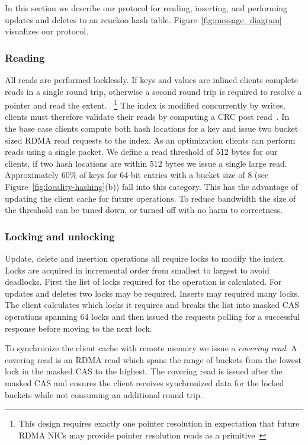 In this section we describe our protocol for reading,
inserting, and performing updates and deletes to an rcuckoo
hash table. Figure~\ref{fig:message_diagram} visualizes our
protocol.

\subsubsection{Reading} All reads are performed locklessly.
If keys and values are inlined clients complete reads in a
single round trip, otherwise a second round trip is required
to resolve a pointer and read the extent. 
~\footnote{This design requires exactly one pointer
resolution in expectation that future RDMA NICs may provide
pointer resolution reads as a primitive~\cite{prism}}
The index is modified concurrently by writes, clients must
therefore validate their reads by computing a CRC post
read~\cite{pilaf,cell}.
In the base case clients compute both hash locations for a
key and issue two bucket sized RDMA read requests to the
index. As an optimization clients can perform reads using a
single packet. We define a read threshold of 512 bytes for
our clients, if two hash locations are within 512 bytes we
issue a single large read.  Approximately 60\% of keys for
64-bit entries with a bucket size of 8 (see
Figure~\ref{fig:locality-hashing}(b)) fall into this
category. This has the advantage of updating the client
cache for future operations.
To reduce bandwidth the size
of the threshold can be tuned down, or turned off with no
harm to correctness.

\subsubsection{Locking and unlocking}

Update, delete and insertion operations all require locks to
modify the index. Locks are acquired in incremental order
from smallest to largest to avoid deadlocks. First the list
of locks required for the operation is calculated. For
updates and deletes two locks may be required. Inserts may
required many locks. The client calculates which locks it
requires and breaks the list into masked CAS operations
spanning 64 locks and then issued the requests polling for a
successful response before moving to the next lock.

To synchronize the client cache with remote memory we issue
a \textit{covering read}. A covering read is an RDMA read
which spans the range of buckets from the lowest lock in the
masked CAS to the highest. The covering read is issued after
the masked CAS and ensures the client receives synchronized
data for the locked buckets while not consuming an
additional round trip.

